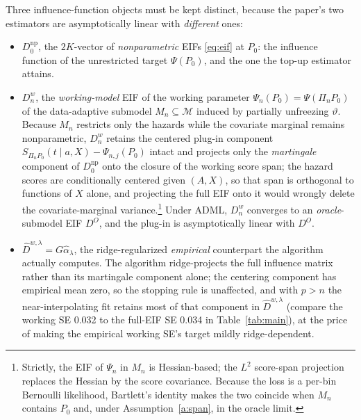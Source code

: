 \documentclass[11pt]{article}
\theoremstyle{remark}
\begin{document}
Three influence-function objects must be kept distinct, because the paper's two estimators are asymptotically linear with \emph{different} ones:
\begin{itemize}
\item $D^{\mathrm{np}}_0$, the $2K$-vector of \emph{nonparametric} EIFs \eqref{eq:eif} at $P_0$: the influence function of the unrestricted target $\Psi(P_0)$, and the one the top-up estimator attains.
\item $D^{w}_n$, the \emph{working-model} EIF of the working parameter $\Psi_n(P_0)=\Psi(\Pi_n P_0)$ of the data-adaptive submodel $M_n\subseteq\mathcal M$ induced by partially unfreezing $\vartheta$. Because $M_n$ restricts only the hazards while the covariate marginal remains nonparametric, $D^{w}_n$ retains the centered plug-in component $S_{\Pi_n P_0}(t\mid a,X)-\Psi_{n,j}(P_0)$ intact and projects only the \emph{martingale} component of $D^{\mathrm{np}}_0$ onto the closure of the working score span; the hazard scores are conditionally centered given $(A,X)$, so that span is orthogonal to functions of $X$ alone, and projecting the full EIF onto it would wrongly delete the covariate-marginal variance.\footnote{Strictly, the EIF of $\Psi_n$ in $M_n$ is Hessian-based; the $L^2$ score-span projection replaces the Hessian by the score covariance. Because the loss is a per-bin Bernoulli likelihood, Bartlett's identity makes the two coincide when $M_n$ contains $P_0$ and, under Assumption~\ref{a:span}, in the oracle limit.} Under ADML, $D^{w}_n$ converges to an \emph{oracle}-submodel EIF $D^{O}$, and the plug-in is asymptotically linear with $D^{O}$.
\item $\widehat D^{w,\lambda} = G\widehat\alpha_\lambda$, the ridge-regularized \emph{empirical} counterpart the algorithm actually computes. The algorithm ridge-projects the full influence matrix rather than its martingale component alone; the centering component has empirical mean zero, so the stopping rule is unaffected, and with $p > n$ the near-interpolating fit retains most of that component in $\widehat D^{w,\lambda}$ (compare the working SE 0.032 to the full-EIF SE 0.034 in Table~\ref{tab:main}), at the price of making the empirical working SE's target mildly ridge-dependent.
\end{itemize}
\end{document}

